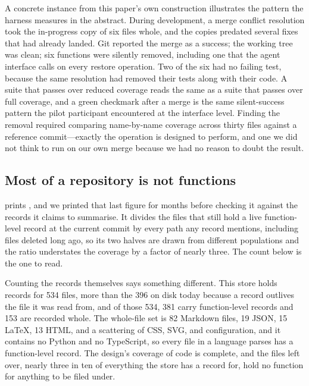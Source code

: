 A concrete instance from this paper's own construction illustrates the pattern
the harness measures in the abstract. During development, a merge conflict
resolution took the in-progress copy of six files whole, and the copies predated
several fixes that had already landed. Git reported the merge as a success; the
working tree was clean; six functions were silently removed, including one that
the agent interface calls on every restore operation. Two of the six had no
failing test, because the same resolution had removed their tests along with
their code. A suite that passes over reduced coverage reads the same as a suite
that passes over full coverage, and a green checkmark after a merge is the same
silent-success pattern the pilot participant encountered at the interface level.
Finding the removal required comparing name-by-name coverage across thirty files
against a reference commit---exactly the operation \sgt{} is designed to
perform, and one we did not think to run on our own merge because we had no
reason to doubt the result.

\subsection{Most of a repository is not functions}
\label{sec:coverage}

 prints , and we printed that last figure for months before checking
it against the records it claims to summarise. It divides the files that still hold
a live function-level record at the current commit by every path any record
mentions, including files deleted long ago, so its two halves are drawn from
different populations and the ratio understates the coverage by a factor of nearly
three. The count below is the one to read.

Counting the records themselves says something different. This store holds records for
534 files, more than the 396 on disk today because a record outlives the file it was
read from, and of those 534, 381 carry function-level records and 153 are recorded
whole. The whole-file set is 82 Markdown files, 19 JSON, 15 \LaTeX{}, 13 HTML, and a
scattering of CSS, SVG, and configuration, and it contains no Python and no
TypeScript, so every file in a language \sgt{} parses has a function-level record. The
design's coverage of code is complete, and the files left over, nearly three in ten of
everything the store has a record for, hold no function for anything to be filed
under.


